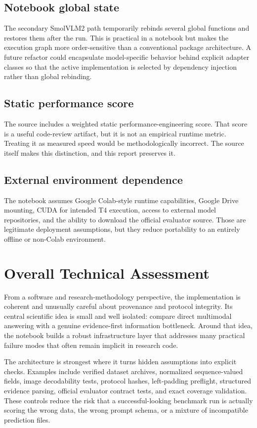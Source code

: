 \documentclass[11pt,a4paper]{article}
\begin{document}
\subsection{Notebook global state}
The secondary SmolVLM2 path temporarily rebinds several global functions and restores them after the run. This is practical in a notebook but makes the execution graph more order-sensitive than a conventional package architecture. A future refactor could encapsulate model-specific behavior behind explicit adapter classes so that the active implementation is selected by dependency injection rather than global rebinding.

\subsection{Static performance score}
The source includes a weighted static performance-engineering score. That score is a useful code-review artifact, but it is not an empirical runtime metric. Treating it as measured speed would be methodologically incorrect. The source itself makes this distinction, and this report preserves it.

\subsection{External environment dependence}
The notebook assumes Google Colab-style runtime capabilities, Google Drive mounting, CUDA for intended T4 execution, access to external model repositories, and the ability to download the official evaluator source. Those are legitimate deployment assumptions, but they reduce portability to an entirely offline or non-Colab environment.

\section{Overall Technical Assessment}
From a software and research-methodology perspective, the implementation is coherent and unusually careful about provenance and protocol integrity. Its central scientific idea is small and well isolated: compare direct multimodal answering with a genuine evidence-first information bottleneck. Around that idea, the notebook builds a robust infrastructure layer that addresses many practical failure modes that often remain implicit in research code.

The architecture is strongest where it turns hidden assumptions into explicit checks. Examples include verified dataset archives, normalized sequence-valued fields, image decodability tests, protocol hashes, left-padding preflight, structured evidence parsing, official evaluator contract tests, and exact coverage validation. These controls reduce the risk that a successful-looking benchmark run is actually scoring the wrong data, the wrong prompt schema, or a mixture of incompatible prediction files.
\end{document}
